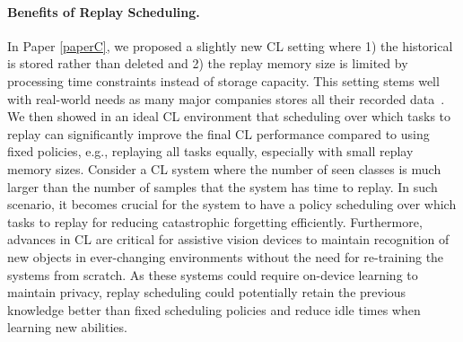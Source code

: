 \paragraph{Benefits of Replay Scheduling.} In Paper \ref{paperC}, we proposed a slightly new CL setting where 1) the historical is stored rather than deleted and 2) the replay memory size is limited by processing time constraints instead of storage capacity. This setting stems well with real-world needs as many major companies stores all their recorded data~\cite{bailis2017macrobase,hazelwood2018applied}. We then showed in an ideal CL environment that scheduling over which tasks to replay can significantly improve the final CL performance compared to using fixed policies, e.g., replaying all tasks equally, especially with small replay memory sizes. Consider a CL system where the number of seen classes is much larger than the number of samples that the system has time to replay. In such scenario, it becomes crucial for the system to have a policy scheduling over which tasks to replay for reducing catastrophic forgetting efficiently. Furthermore, advances in CL are critical for assistive vision devices to maintain recognition of new objects in ever-changing environments without the need for re-training the systems from scratch. As these systems could require on-device learning to maintain privacy, replay scheduling could potentially retain the previous knowledge better than fixed scheduling policies and reduce idle times when learning new abilities. 





